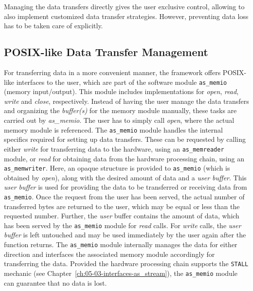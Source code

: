 Managing the data transfers directly gives the user exclusive control, allowing to also implement customized data transfer strategies.
However, preventing data loss has to be taken care of explicitly.


\subsection{POSIX-like Data Transfer Management}
For transferring data in a more convenient manner, the \asterics framework offers POSIX-like interfaces to the user, which are part of the software module \texttt{as\_memio} (memory input/output).
This module includes implementations for \textit{open}, \textit{read}, \textit{write} and \textit{close}, respectively.
Instead of having the user manage the data transfers and organizing the \textit{buffer(s)} for the memory module manually, these tasks are carried out by \textit{as\_memio}.
The user has to simply call \textit{open}, where the actual memory module is referenced.
The \texttt{as\_memio} module handles the internal specifics required for setting up data transfers.
These can be requested by calling either \textit{write} for transferring data to the hardware, using an \texttt{as\_memreader} module, or \textit{read} for obtaining data from the hardware processing chain, using an \texttt{as\_memwriter}.
Here, an opaque structure is provided to \texttt{as\_memio} (which is obtained by \textit{open}), along with the desired amount of data and a \textit{user buffer}.
This \textit{user buffer} is used for providing the data to be transferred or receiving data from \texttt{as\_memio}.
Once the request from the user has been served, the actual number of transferred bytes are returned to the user, which may be equal or less than the requested number.
Further, the \textit{user} buffer contains the amount of data, which has been served by the \texttt{as\_memio} module for \textit{read} calls.
For \textit{write} calls, the \textit{user buffer} is left untouched and may be used immediately by the user again after the function returns.
The \texttt{as\_memio} module internally manages the data for either direction and interfaces the associated memory module accordingly for transferring the data.
Provided the hardware processing chain supports the \texttt{STALL} mechanic (see Chapter~\ref{ch:05-03-interfaces-as_stream}), the \texttt{as\_memio} module can guarantee that no data is lost.



